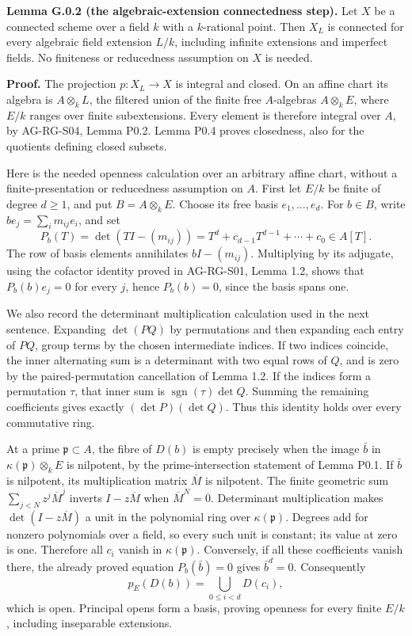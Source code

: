 \documentclass[11pt,a4paper,openany]{report}
\begin{document}
\label{AG-RG-S08-algebraic-extension-connectedness}

\textbf{Lemma G.0.2 (the algebraic-extension connectedness step).} Let \(X\) be a connected scheme over a field \(k\) with a \(k\)-rational point. Then \(X_L\) is connected for every algebraic field extension \(L/k\), including infinite extensions and imperfect fields. No finiteness or reducedness assumption on \(X\) is needed.

\textbf{Proof.} The projection \(p:X_L\to X\) is integral and closed. On an affine chart its algebra is \(A\otimes_kL\), the filtered union of the finite free \(A\)-algebras \(A\otimes_kE\), where \(E/k\) ranges over finite subextensions. Every element is therefore integral over \(A\), by AG-RG-S04, Lemma P0.2. Lemma P0.4 proves closedness, also for the quotients defining closed subsets.

Here is the needed openness calculation over an arbitrary affine chart, without a finite-presentation or reducedness assumption on \(A\). First let \(E/k\) be finite of degree \(d\geq1\), and put \(B=A\otimes_kE\). Choose its free basis \(e_1,\ldots,e_d\). For \(b\in B\), write \(b e_j=\sum_i m_{ij}e_i\), and set \[
 P_b(T)=\det(TI-(m_{ij}))=T^d+c_{d-1}T^{d-1}+\cdots+c_0\in A[T].
\] The row of basis elements annihilates \(bI-(m_{ij})\). Multiplying by its adjugate, using the cofactor identity proved in AG-RG-S01, Lemma 1.2, shows that \(P_b(b)e_j=0\) for every \(j\), hence \(P_b(b)=0\), since the basis spans one.

We also record the determinant multiplication calculation used in the next sentence. Expanding \(\det(PQ)\) by permutations and then expanding each entry of \(PQ\), group terms by the chosen intermediate indices. If two indices coincide, the inner alternating sum is a determinant with two equal rows of \(Q\), and is zero by the paired-permutation cancellation of Lemma 1.2. If the indices form a permutation \(\tau\), that inner sum is \(\operatorname{sgn}(\tau)\det Q\). Summing the remaining coefficients gives exactly \((\det P)(\det Q)\). Thus this identity holds over every commutative ring.

At a prime \(\mathfrak p\subset A\), the fibre of \(D(b)\) is empty precisely when the image \(\bar b\) in \(\kappa(\mathfrak p)\otimes_kE\) is nilpotent, by the prime-intersection statement of Lemma P0.1. If \(\bar b\) is nilpotent, its multiplication matrix \(\overline M\) is nilpotent. The finite geometric sum \(\sum_{j<N}z^j\overline M^j\) inverts \(I-z\overline M\) when \(\overline M^N=0\). Determinant multiplication makes \(\det(I-z\overline M)\) a unit in the polynomial ring over \(\kappa(\mathfrak p)\). Degrees add for nonzero polynomials over a field, so every such unit is constant; its value at zero is one. Therefore all \(c_i\) vanish in \(\kappa(\mathfrak p)\). Conversely, if all these coefficients vanish there, the already proved equation \(P_b(\bar b)=0\) gives \(\bar b^d=0\). Consequently \[
 p_E(D(b))=\bigcup_{0\leq i<d}D(c_i),
\] which is open. Principal opens form a basis, proving openness for every finite \(E/k\), including inseparable extensions.
\end{document}
